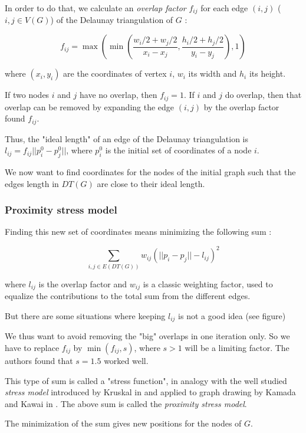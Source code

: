 \documentclass[12pt]{report}
\begin{document}
\bigskip
In order to do that, we calculate an \emph{overlap factor} $f_{ij}$ for each edge $(i,j)$ ($i,j \in V(G)$) of the Delaunay triangulation of $G$ :

\[ f_{ij} = \max \left( \min \left(\frac{w_i/2 + w_j/2}{x_i - x_j}, 
\frac{h_i/2 + h_j/2}{y_i - y_j} \right), 1 \right)\]

where $(x_i,y_i)$ are the coordinates of vertex $i$, $w_i$ its width and $h_i$ its height.

If two nodes $i$ and $j$ have no overlap, then $f_{ij} = 1$. 
If $i$ and $j$ do overlap, then that overlap can be removed by expanding the edge $(i,j)$ by the overlap factor found $f_{ij}$. %

\bigskip
Thus, the "ideal length" of an edge of the Delaunay triangulation is $l_{ij} = f_{ij}||p_i^0 - p_j^0||$, where $p_i^0$ is the initial set of coordinates of a node $i$.

We now want to find coordinates for the nodes of the initial graph such that the edges length in $DT(G)$ are close to their ideal length.

\subsubsection{Proximity stress model}

Finding this new set of coordinates means minimizing the following sum :

\[ \sum_{i,j \in E(DT(G))} w_{ij}(||p_i - p_j|| - l_{ij})^2\]

where $l_{ij}$ is the overlap factor and $w_{ij}$ is a classic weighting factor, used to equalize the contributions to the total sum from the different edges.

But there are some situations where keeping $l_{ij}$ is not a good idea (see figure) %

We thus want to avoid removing the "big" overlaps in one iteration only.
So we have to replace $f_{ij}$ by $\min(f_{ij},s)$, where $s > 1$ will be a limiting factor. The authors found that $s = 1.5$ worked well.

This type of sum is called a "stress function", in analogy with the well studied \emph{stress model} introduced by Kruskal in \cite{Kruskal64} and applied to graph drawing by Kamada and Kawai in \cite{Kamada89}. 
The above sum is called the \emph{proximity stress model}.

\bigskip
The minimization of the sum gives new positions for the nodes of $G$.
\end{document}
